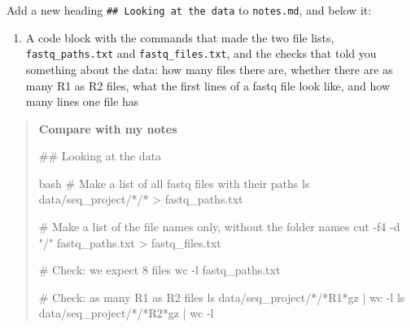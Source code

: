 \documentclass[
  letterpaper,
  DIV=11,
  numbers=noendperiod]{scrreprt}
\newenvironment{Shaded}{}{}
\newcommand{\AttributeTok}[1]{\textcolor[rgb]{0.84,0.23,0.29}{#1}}
\newcommand{\CommentTok}[1]{\textcolor[rgb]{0.42,0.45,0.49}{#1}}
\newcommand{\FunctionTok}[1]{\textcolor[rgb]{0.44,0.26,0.76}{#1}}
\newcommand{\InformationTok}[1]{\textcolor[rgb]{0.42,0.45,0.49}{#1}}
\newcommand{\KeywordTok}[1]{\textcolor[rgb]{0.84,0.23,0.29}{#1}}
\newcommand{\NormalTok}[1]{\textcolor[rgb]{0.14,0.16,0.18}{#1}}
\newcommand{\OperatorTok}[1]{\textcolor[rgb]{0.14,0.16,0.18}{#1}}
\newcommand{\PreprocessorTok}[1]{\textcolor[rgb]{0.84,0.23,0.29}{#1}}
\newcommand{\StringTok}[1]{\textcolor[rgb]{0.01,0.18,0.38}{#1}}
\providecommand{\tightlist}{%
  \setlength{\itemsep}{0pt}\setlength{\parskip}{0pt}}
\begin{document}
\begin{tcolorbox}[enhanced jigsaw, coltitle=black, breakable, titlerule=0mm, colback=white, rightrule=.15mm, bottomrule=.15mm, toprule=.15mm, colframe=quarto-callout-color-frame, colbacktitle=quarto-callout-color!10!white, bottomtitle=1mm, opacitybacktitle=0.6, toptitle=1mm, leftrule=.75mm, arc=.35mm, title=\textcolor{quarto-callout-color}{\faInfo}\hspace{0.5em}{Notebook checkpoint: Looking at the data}, left=2mm, opacityback=0]

Add a new heading \texttt{\#\#\ Looking\ at\ the\ data} to
\texttt{notes.md}, and below it:

\begin{enumerate}
\def\labelenumi{\arabic{enumi}.}
\tightlist
\item
  A code block with the commands that made the two file lists,
  \texttt{fastq\_paths.txt} and \texttt{fastq\_files.txt}, and the
  checks that told you something about the data: how many files there
  are, whether there are as many R1 as R2 files, what the first lines of
  a fastq file look like, and how many lines one file has
\end{enumerate}

\begin{quote}
\textbf{Compare with my notes}

\begin{Shaded}
\begin{Highlighting}[]
\FunctionTok{\#\# Looking at the data}

\InformationTok{\textasciigrave{}\textasciigrave{}\textasciigrave{}bash}
\CommentTok{\# Make a list of all fastq files with their paths}
\FunctionTok{ls}\NormalTok{ data/seq\_project/}\PreprocessorTok{*}\NormalTok{/}\PreprocessorTok{*} \OperatorTok{\textgreater{}}\NormalTok{ fastq\_paths.txt}

\CommentTok{\# Make a list of the file names only, without the folder names}
\FunctionTok{cut} \AttributeTok{{-}f4} \AttributeTok{{-}d} \StringTok{"/"}\NormalTok{ fastq\_paths.txt }\OperatorTok{\textgreater{}}\NormalTok{ fastq\_files.txt}

\CommentTok{\# Check: we expect 8 files}
\FunctionTok{wc} \AttributeTok{{-}l}\NormalTok{ fastq\_paths.txt}

\CommentTok{\# Check: as many R1 as R2 files}
\FunctionTok{ls}\NormalTok{ data/seq\_project/}\PreprocessorTok{*}\NormalTok{/}\PreprocessorTok{*}\NormalTok{R1}\PreprocessorTok{*}\NormalTok{gz }\KeywordTok{|} \FunctionTok{wc} \AttributeTok{{-}l}
\FunctionTok{ls}\NormalTok{ data/seq\_project/}\PreprocessorTok{*}\NormalTok{/}\PreprocessorTok{*}\NormalTok{R2}\PreprocessorTok{*}\NormalTok{gz }\KeywordTok{|} \FunctionTok{wc} \AttributeTok{{-}l}


\end{Highlighting}
\end{Shaded}
\end{quote}
\end{tcolorbox}
\end{document}
